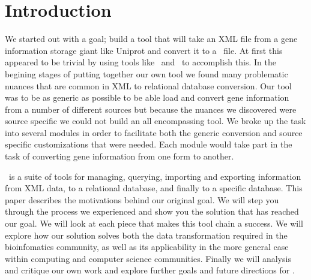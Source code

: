 \section{Introduction}
We started out with a goal; build a tool that will take an XML file from a gene information storage giant like Uniprot and convert it to a \Genmapp~file. At first this appeared to be trivial by using tools like ~and \Hibernate~to accomplish this. In the begining stages of putting together our own tool we found many problematic nuances that are common in XML to relational database conversion. Our tool was to be as generic as possible to be able load and convert gene information from a number of different sources but because the nuances we discovered were source specific we could not build an all encompassing tool. We broke up the task into several modules in order to facilitate both the generic conversion and source specific customizations that were needed.  Each module would take part in the task of converting gene information from one form to another.

\xmlpipedb~is a suite of tools for managing, querying, importing and exporting information from XML data, to a relational database, and finally to a \Genmapp specific database. This paper describes the motivations behind our original goal.  We will step you through the process we experienced and show you the solution that has reached our goal. We will look at each piece that makes this tool chain a success.  We will explore how our solution solves both the data transformation required in the bioinfomatics community, as well as its applicability in the more general case within computing and computer science communities.  Finally we will analysis and critique our own work and explore further goals and future directions for \xmlpipedb.
